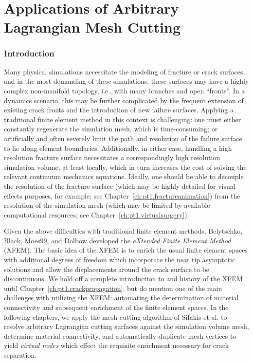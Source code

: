 %

\part{Applications of Arbitrary Lagrangian Mesh Cutting}

\section*{Introduction}

Many physical simulations necessitate the modeling of fracture or crack surfaces, and in the most demanding of these simulations, these surfaces may have a highly complex non-manifold topology, i.e., with many branches and open ``fronts''. In a dynamics scenario, this may be further complicated by the frequent extension of existing crack fronts and the introduction of new failure surfaces. Applying a traditional finite element method in this context is challenging: one must either constantly regenerate the simulation mesh, which is time-consuming; or artificially and often severely limit the path and resolution of the failure surface to lie along element boundaries. Additionally, in either case, handling a high resolution fracture surface necessitates a correspondingly high resolution simulation volume, at least locally, which in turn increases the cost of solving the relevant continuum mechanics equations. Ideally, one should be able to decouple the resolution of the fracture surface (which may be highly detailed for visual effects purposes, for example; see Chapter~\ref{ch:pt1.fractureanimation}) from the resolution of the simulation mesh (which may be limited by available computational resources; see Chapter~\ref{ch:pt1.virtualsurgery}).

Given the above difficulties with traditional finite element methods, Belytschko, Black, Moes99, and Dolbow \cite{Belytschko99, Moes99} developed the \emph{eXtended Finite Element Method} \linebreak[4] (XFEM). The basic idea of the XFEM is to enrich the usual finite element spaces with additional degrees of freedom which incorporate the near tip asymptotic solutions and allow the displacements around the crack surface to be discontinuous. We hold off a complete introduction to and history of the XFEM until Chapter~\ref{ch:pt1.crackpropagation}, but do mention one of the main challenges with utilizing the XFEM: automating the determination of material connectivity and subsequent enrichment of the finite element spaces. In the following chapters, we apply the mesh cutting algorithm of Sifakis et al. \cite{Sifakis07} to resolve arbitrary Lagrangian cutting surfaces against the simulation volume mesh, determine material connectivity, and automatically duplicate mesh vertices to yield \emph{virtual nodes} which effect the requisite enrichment necessary for crack separation.

